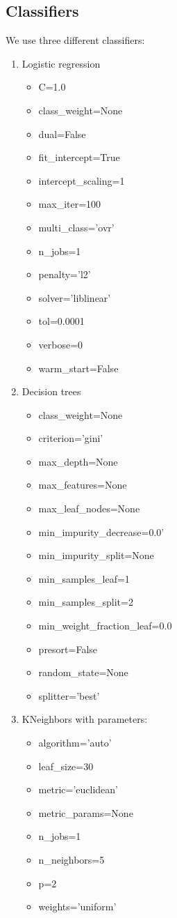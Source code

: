 \documentclass{article} %
\begin{document}
\subsection{Classifiers}

 We use three different classifiers:

  \begin{enumerate}   
    \item Logistic regression
    \begin{itemize}
    	\item C=1.0
    	\item class\_weight=None 
    	\item dual=False
    	\item fit\_intercept=True 
    	\item intercept\_scaling=1
    	\item max\_iter=100 
    	\item multi\_class='ovr'
    	\item n\_jobs=1 
    	\item penalty='l2'
    	\item solver='liblinear'
    	\item tol=0.0001
    	\item verbose=0
    	\item warm\_start=False 
    \end{itemize}
    \item Decision trees
    \begin{itemize}
    	\item class\_weight=None 
    	\item criterion='gini'
    	\item max\_depth=None 
    	\item max\_features=None
    	\item max\_leaf\_nodes=None
    	\item min\_impurity\_decrease=0.0'
    	\item min\_impurity\_split=None 
    	\item min\_samples\_leaf=1
    	\item min\_samples\_split=2
    	\item min\_weight\_fraction\_leaf=0.0
    	\item presort=False
    	\item random\_state=None
    	\item splitter='best'
    \end{itemize}
  	\item KNeighbors with parameters:
      \begin{itemize}
      	\item algorithm='auto' 
      	\item leaf\_size=30
      	\item metric='euclidean'
      	\item metric\_params=None
      	\item n\_jobs=1
      	\item n\_neighbors=5
      	\item p=2
      	\item weights='uniform'
      \end{itemize}
   \end{enumerate}
\end{document}
